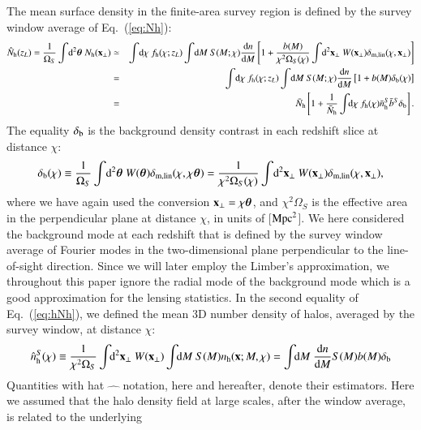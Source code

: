 \documentclass[onecolumn,notitlepage,showpacs,amsmath,amssymb,prd,floatfix]{revtex4-1}
\newcommand{\bx}{{\bf x}}
\newcommand{\btheta}{{\bm{\theta}}}
\newcommand{\dr}{\mathrm{d}}
\newcommand{\deltab}{\delta_{\rm b}}
\newcommand{\deltaml}{\delta_{\mathrm{m,lin}}}
\newcommand{\bh}{\mathrm{h}}
\newcommand{\bnh}{\frac{\dr n}{\dr M}}
\newcommand{\bnhs}{\bar{n}_{\rm h}^S}
\newcommand{\hNh}{\hat{N}_{\rm h}}
\newcommand{\bNh}{\bar{N}_{\rm h}}
\newcommand{\hnh}{\hat{n}_{\mathrm{h}}}
\begin{document}
The mean surface density in the finite-area survey region is defined by
the survey window average of Eq.~(\ref{eq:Nh}):
%
\begin{eqnarray}
 \hNh(z_L)=\frac{1}{\Omega_S}\int\!\dr^2\btheta~N_{\rm h}(\bx_\perp)
 &\simeq &\int\!\dr\chi~f_\bh(\chi;z_L)\int\!\dr M~S(M;\chi)\frac{\dr
 n}{\dr M}\left[
	       1+\frac{b(M)}{\chi^2\Omega_S(\chi)}\int\!\dr^2\bx_\perp~W(\bx_\perp)
	       \deltaml(\chi,\bx_\perp)\right]\nonumber\\
&=&\int\!\dr\chi~f_\bh(\chi;z_L)\int\!\dr M~S(M;\chi)\frac{\dr n}{\dr
 M}\left[1+b(M)\deltab(\chi)\right]\nonumber\\
&=& \bNh\left[1+\frac{1}{\bNh}\int\!\!\dr\chi~f_{\rm h}(\chi)\bnhs\bar{b}^S\deltab\right].
\label{eq:hNh}
\end{eqnarray}
%
The equality $\deltab$ is the background density contrast
in each redshift slice at distance $\chi$:
%
\begin{equation}
\deltab(\chi)\equiv
 \frac{1}{\Omega_S}\int\!\dr^2\btheta~W(\btheta)\deltaml(\chi,\chi\btheta)
 =\frac{1}{\chi^2\Omega_S(\chi)}\int\!\dr^2\bx_\perp ~W(\bx_\perp)\deltaml(\chi,\bx_\perp),
\label{eq:deltab}
\end{equation}
%
where we have again used the conversion $\bx_\perp =\chi\btheta$, and
$\chi^2\Omega_S$ is the effective area in the perpendicular plane at
distance $\chi$, in units of [${\rm Mpc}^2$]. We here considered the
background mode at each redshift that is defined by the survey window
average of Fourier modes in the two-dimensional plane perpendicular to
the line-of-sight direction. Since we will later employ the Limber's
approximation, we throughout this paper ignore the radial mode of the
background mode which is a good approximation for the lensing
statistics. In the second equality of Eq.~(\ref{eq:hNh}), we defined the
mean 3D number density of halos, averaged by the survey window, at
distance $\chi$:
%
\begin{equation}
 \hnh^S(\chi)\equiv \frac{1}{\chi^2\Omega_S}\int\!\!\dr^2\bx_\perp~
  W(\bx_\perp)\int\!\!\dr M~
  S(M)n_{\bh}(\bx; M, \chi)=
  \int\!\!\dr M~\bnh S(M)b(M)\deltab
  \label{eq:hnhS}
\end{equation}
%
Quantities with hat $\hat{\hspace{1em}}$ notation, here and hereafter,
denote their estimators.  Here we assumed that the halo density field at
large scales, after the window average, is related to the underlying
\end{document}
